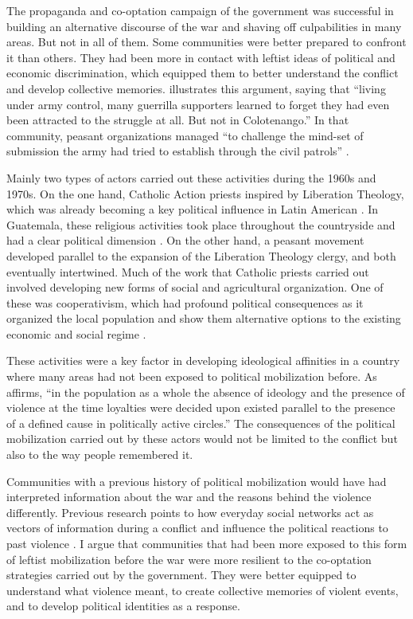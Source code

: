 \documentclass[12pt, notitlepage]{article}
\begin{document}
The propaganda and co-optation campaign of the government was successful in building an alternative discourse of the war and shaving off culpabilities in many areas.
But not in all of them.
Some communities were better prepared to confront it than others.
They had been more in contact with leftist ideas of political and economic discrimination, which equipped them to better understand the conflict and develop collective memories.
\citet[223]{Kobrak:2013aa} illustrates this argument, saying that ``living under army control, many guerrilla supporters learned to forget they had even been attracted to the struggle at all. But not in Colotenango.''
In that community, peasant organizations managed ``to challenge the mind-set of submission the army had tried to establish through the civil patrols'' \citep[226]{Kobrak:2013aa}.

Mainly two types of actors carried out these activities during the 1960s and 1970s.
On the one hand, Catholic Action priests inspired by Liberation Theology, which was already becoming a key political influence in Latin American \citep[e.g.][]{Wood:2003aa}.
In Guatemala, these religious activities took place throughout the countryside and had a clear political dimension \citep{Carmack:1988aa, Manz:1988aa, Manz:2004aa, LeBot:1992aa, Bateson:2013aa}.
On the other hand, a peasant movement developed parallel to the expansion of the Liberation Theology clergy, and both eventually intertwined.
Much of the work that Catholic priests carried out involved developing new forms of social and agricultural organization.
One of these was cooperativism, which had profound political consequences as it organized the local population and show them alternative options to the existing economic and social regime \citep{Arias:1992aa, Nelson:2009aa, Bateson:2013aa}.

These activities were a key factor in developing ideological affinities in a country where many areas had not been exposed to political mobilization before.
As \citet[84]{Lofving:2005aa} affirms, ``in the population as a whole the absence of ideology and the presence of violence at the time loyalties were decided upon existed parallel to the presence of a defined cause in politically active circles.''
The consequences of the political mobilization carried out by these actors would not be limited to the conflict but also to the way people remembered it.

Communities with a previous history of political mobilization would have had interpreted information about the war and the reasons behind the violence differently.
Previous research points to how everyday social networks act as vectors of information during a conflict \citep{Shesterinina:2016aa} and influence the political reactions to past violence \citep{Rydgren:2007aa, Dorff:2017aa}.
I argue that communities that had been more exposed to this form of leftist mobilization before the war were more resilient to the co-optation strategies carried out by the government.
They were better equipped to understand what violence meant, to create collective memories of violent events, and to develop political identities as a response.
\end{document}
